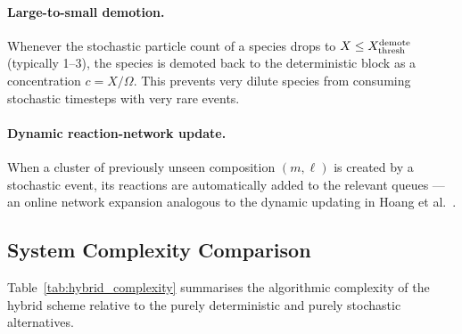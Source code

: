\documentclass[pdflatex,sn-basic]{sn-jnl} %
\begin{document}
\paragraph{Large-to-small demotion.}
Whenever the stochastic particle count of a species drops to
$X \leq X_{\rm thresh}^{\rm demote}$ (typically 1--3),
the species is demoted back to the deterministic block as a
concentration $c = X/\Omega$.  This prevents very dilute
species from consuming stochastic timesteps with very rare events.

\paragraph{Dynamic reaction-network update.}
When a cluster of previously unseen composition $(m,\ell)$ is
created by a stochastic event, its reactions are automatically
added to the relevant queues --- an online network expansion
analogous to the dynamic updating in Hoang et al.~\cite{Hoang2015}.

\subsection{System Complexity Comparison}
\label{sec:hybrid_complexity}

Table~\ref{tab:hybrid_complexity} summarises the algorithmic
complexity of the hybrid scheme relative to the purely deterministic
and purely stochastic alternatives.
\end{document}
